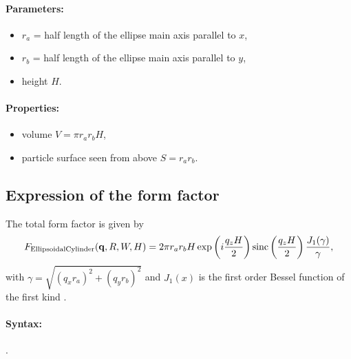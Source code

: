 \paragraph{Parameters:}
\begin{itemize}
\item $r_a$ = half length of the ellipse main axis parallel to $x$,
\item$r_b$ = half length of the ellipse main axis parallel to $y$, 
\item height $H$.
\end{itemize}

\paragraph{Properties:}
\begin{itemize}
\item volume $V = \pi r_a r_bH$,
\item particle surface seen from above $S = r_a r_b$.
\end{itemize}

\subsection{Expression of the form factor}
The total form factor is given by 
\begin{equation*}
F_{\rm{EllipsoidalCylinder}}(\mathbf{q},R,W,H) = 2\pi r_a r_b H \exp\left(i\frac{q_z
  H}{2}\right)\operatorname{sinc}\left(\frac{q_z H}{2}\right) \frac{J_1(\gamma)}{\gamma},
\end{equation*}
with $\gamma=\sqrt{(q_x r_a)^2+(q_y r_b)^2}$ and $J_1(x)$ is the first order
Bessel function of the first kind \cite{AbSt64}.

\paragraph{Syntax:} .

